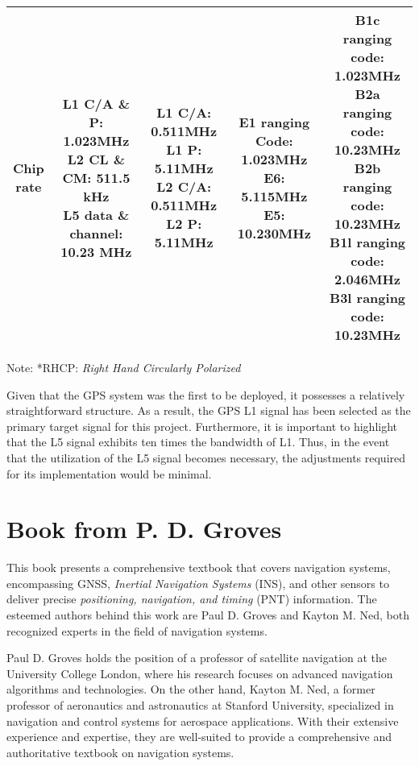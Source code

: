 \begin{landscape}
\begin{center}
\begin{table}
\begin{tabular}{ccccc}
    \thead{Chip\\rate} & \thead{L1 C/A \& P: 1.023MHz\\L2 CL \& CM: 511.5 kHz\\L5 data \& channel: 10.23 MHz} & \thead{L1 C/A: 0.511MHz\\L1 P: 5.11MHz\\L2 C/A: 0.511MHz\\L2 P: 5.11MHz} & \thead{E1 ranging Code: 1.023MHz\\E6: 5.115MHz\\E5: 10.230MHz} & \thead{B1c ranging code: 1.023MHz\\B2a ranging code: 10.23MHz\\B2b ranging code: 10.23MHz\\B1l ranging code: 2.046MHz\\B3l ranging code: 10.23MHz}\\
    \bottomrule
    \end{tabular}
    \footnotesize Note: *RHCP: \textit{Right Hand Circularly Polarized}
\end{table}
\end{center}
\end{landscape}
Given that the GPS system was the first to be deployed, it possesses a relatively straightforward structure. As a result, the GPS L1 signal has been selected as the primary target signal for this project. Furthermore, it is important to highlight that the L5 signal exhibits ten times the bandwidth of L1. Thus, in the event that the utilization of the L5 signal becomes necessary, the adjustments required for its implementation would be minimal.

\section{Book from P. D. Groves\texorpdfstring{\cite{RN178}}{}}
This book presents a comprehensive textbook that covers navigation systems, encompassing GNSS, \textit{Inertial Navigation Systems} (INS), and other sensors to deliver precise \textit{positioning, navigation, and timing} (PNT) information. The esteemed authors behind this work are Paul D. Groves and Kayton M. Ned, both recognized experts in the field of navigation systems.

Paul D. Groves holds the position of a professor of satellite navigation at the University College London, where his research focuses on advanced navigation algorithms and technologies. On the other hand, Kayton M. Ned, a former professor of aeronautics and astronautics at Stanford University, specialized in navigation and control systems for aerospace applications. With their extensive experience and expertise, they are well-suited to provide a comprehensive and authoritative textbook on navigation systems.


